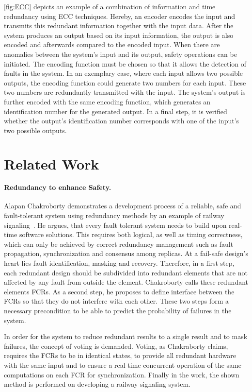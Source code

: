 \autoref{fig:ECC} depicts an example of a combination of information and time redundancy using \gls*{ECC} techniques.
Hereby, an encoder encodes the input and transmits this redundant information together with the input data.
After the system produces an output based on its input information, the output is also encoded and afterwards compared to the encoded input.
When there are anomalies between the system's input and its output, safety operations can be initiated.
The encoding function must be chosen so that it allows the detection of faults in the system.
In an exemplary case, where each input allows two possible outputs, the encoding function could generate two numbers for each input.
These two numbers are redundantly transmitted with the input.
The system's output is further encoded with the same encoding function, which generates an identification number for the generated output.
In a final step, it is verified whether the output's identification number corresponds with one of the input's two possible outputs.

\section{Related Work}
\paragraph{Redundancy to enhance Safety.}
Alapan Chakroborty demonstrates a development process of a reliable, safe and fault-tolerant system using redundancy methods by an example of railway signaling~\cite{ChakrabortyFaultTolerantRailway}.
He argues, that every fault tolerant system needs to build upon real-time software solutions.
This requires both logical, as well as timing correctness, which can only be achieved by correct redundancy management such as fault propagation, synchronization and consensus among replicas.
At a fail-safe design's heart lies fault identification, masking and recovery.
Therefore, in a first step, each redundant design should be subdivided into redundant elements that are not affected by any fault from outside the element.
Chakroborty calls these redundant elements \glspl*{FCR}.
As a second step, he proposes to define interface between the \glspl*{FCR} so that they do not interfere with each other.
These two steps form a necessary precondition to be able to predict the probability of failures in the system.

In order for the system to reduce redundant results to a single result and to mask failures, the concept of voting is demanded.
Voting, as Chakraborty claims, requires the \glspl*{FCR} to be in identical states, to provide all redundant hardware with the same input and to ensure a real-time concurrent operation of the same computations on each \gls*{FCR} for synchronization.
Finally in the work, the shown method is performed on developing a railway signaling system.

